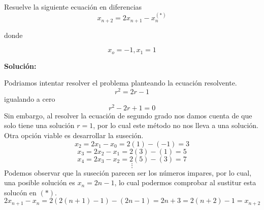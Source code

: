 \documentclass{article}
\begin{document}
Resuelve la siguiente ecuación en diferencias
$$x_{n+2}=2x_{n+1}-x_{n}^{(*)}$$

donde

$$x_{o}=-1,x_{1}=1$$

\textbf{Solución:}

Podriamos intentar resolver el problema planteando la ecuación resolvente.
$$r^{2}=2r-1$$
igualando a cero
$$r^{2}-2r+1=0$$
Sin embargo, al resolver la ecuación de segundo grado nos damos cuenta de que solo tiene una solución $r=1$, por lo cual este método no nos lleva a una solución. Otra opción viable es desarrollar la suseción.
$$x_{2}=2x_{1}-x_{0}=2(1)-(-1)=3$$
$$x_{3}=2x_{2}-x_{1}=2(3)-(1)=5$$
$$x_{4}=2x_{3}-x_{2}=2(5)-(3)=7$$
$$\vdots$$
Podemos observar que la suseción parecen ser los números impares, por lo cual, una posible solución es $x_{n}=2n-1$, lo cual podermos comprobar al sustitur esta  solucón en $(*)$.
$$2x_{n+1}-x_{n}=2(2(n+1)-1)-(2n-1)=2n+3=2(n+2)-1=x_{n+2}$$
\end{document}
